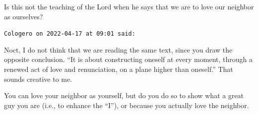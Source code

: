 \begin{footnotesize}
\begin{sffamily}
Is this not the teaching of the Lord when he says that we are to love our neighbor as ourselves?

\hfill

\texttt{Cologero on 2022-04-17 at 09:01 said:}

Noct, I do not think that we are reading the same text, since you draw the opposite conclusion. ``It is about constructing oneself at every moment, through a renewed act of love and renunciation, on a plane higher than oneself.'' That sounds creative to me.

You can love your neighbor as yourself, but do you do so to show what a great guy you are (i.e., to enhance the ``I''), or because you actually love the neighbor.

\hfill

\end{sffamily}
\end{footnotesize}

